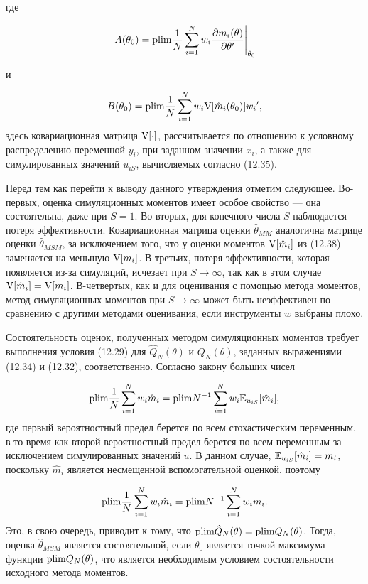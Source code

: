 где

\begin{equation}
\left. A(\theta_0)=\mathrm{plim }\dfrac{1}{N}\sum^{N}_{i=1}w_{i}\dfrac{\partial{m_{i}(\theta)}}{\partial{\theta}'} \right|_{\theta_0}
\end{equation}

и

\begin{equation}
B(\theta_0)=\mathrm{plim }\dfrac{1}{N}\sum^{N}_{i=1}w_{i}\mathrm{V}[\hat{m}_{i}(\theta_0)]{w_{i}}',
\end{equation}
здесь ковариационная матрица $\mathrm{V}[\cdot]$,  рассчитывается по отношению к условному распределению переменной $y_i$, при заданном значении $x_i$, а также для симулированных значений $u_{iS}$, вычисляемых согласно (12.35).

Перед тем как перейти к выводу данного утверждения отметим следующее. Во-первых, оценка симуляционных моментов имеет особое свойство --- она состоятельна, даже при $S=1$. Во-вторых, для конечного числа $S$ наблюдается потеря эффективности. Ковариационная матрица оценки $\hat{\theta}_{MM}$ аналогична матрице оценки $\hat{\theta}_{MSM}$, за исключением того, что у оценки моментов $\mathrm{V}[\hat{m}_i]$ из (12.38) заменяется на меньшую $\mathrm{V}[m_i]$. В-третьих, потеря эффективности, которая появляется из-за симуляций, исчезает при $S \rightarrow \infty$, так как в этом случае $\mathrm{V}[\hat{m}_i] = \mathrm{V}[m_i]$. В-четвертых, как и для оценивания с помощью метода моментов, метод симуляционных моментов при $S \rightarrow \infty$ может быть неэффективен по сравнению с другими методами оценивания, если инструменты $w$ выбраны плохо.

Состоятельность оценок, полученных методом симуляционных моментов требует выполнения условия (12.29) для $\hat{Q}_N(\theta)$ и $Q_N(\theta)$, заданных выражениями (12.34) и (12.32), соответственно. Согласно закону больших чисел

\[
\mathrm{plim }\dfrac{1}{N}\sum^{N}_{i=1}w_{i}\hat{m}_i=\mathrm{plim }{N^{-1}\sum^{N}_{i=1}w_{i}\mathbb{E}_{u_{iS}}[\hat{m}_i]},
\]
где первый вероятностный предел берется по всем стохастическим переменным, в то время как второй вероятностный предел берется по всем переменным за исключением симулированных значений $u$. В данном случае, $\mathbb{E}_{u_{iS}}[\hat{m}_i]=m_i$, поскольку $\hat{m}_i$ является несмещенной вспомогательной оценкой, поэтому

\[
\mathrm{plim }\dfrac{1}{N}\sum^{N}_{i=1}w_{i}\hat{m}_i=\mathrm{plim }{N^{-1}\sum^{N}_{i=1}w_{i}m_{i}}.
\]
Это, в свою очередь, приводит к тому, что $\mathrm{plim }{\hat{Q}_N(\theta)}=\mathrm{plim }{Q_{N}(\theta)}$. Тогда, оценка $\hat{\theta}_{MSM}$ является состоятельной, если $\theta_0$ является точкой максимума функции  $\mathrm{plim }{Q_N(\theta)}$, что является необходимым условием состоятельности исходного метода моментов.

